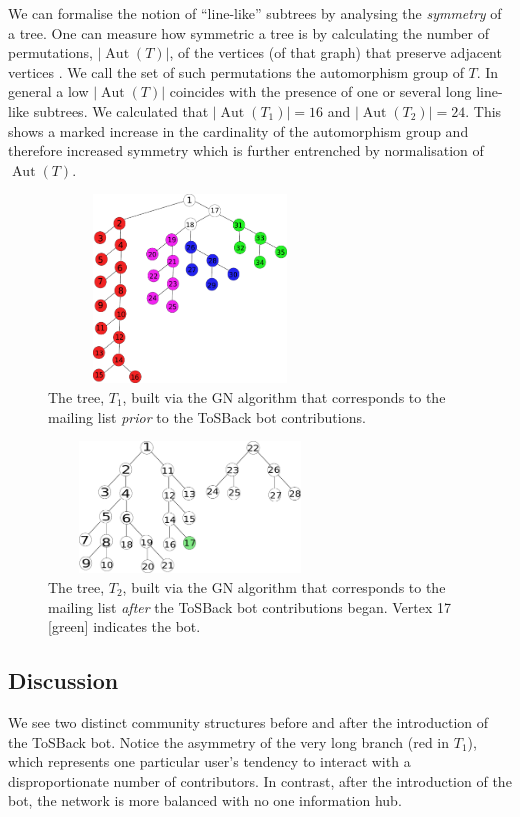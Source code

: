 \documentclass{sig-alternate}
\DeclareMathOperator{\Aut}{Aut}
\begin{document}
We can formalise the notion of “line-like” subtrees by analysing the \emph{symmetry} of  
a tree.  One can measure how symmetric
a tree is by calculating the number of permutations, $\lvert \Aut(T) \rvert$, of the
vertices (of that graph) that preserve adjacent vertices \cite{bela:mgt}. We
call the set of such permutations the automorphism group of $T$. In general a low $\lvert \Aut(T) \rvert$ coincides with the presence of one or several long line-like subtrees.  We calculated that $\lvert \Aut(T_1)\rvert = 16$ and $\vert \Aut(T_2)\rvert = 24$.  This shows a marked
increase in the cardinality of the automorphism group and
therefore increased symmetry which is further entrenched by normalisation of $\Aut(T)$.
\begin{figure}[H]
\includegraphics[width=7.5cm, height  = 5cm]{t15.pdf}\caption{ The tree, $T_1$, built via the GN algorithm that corresponds to the mailing list \emph{prior} to the ToSBack bot contributions.}\label{fig:t1}
\end{figure}
\begin{figure}[H]
\includegraphics[width=7.5cm, height=3.5cm]{t26.pdf}\caption[width=7]{ The tree, $T_2$, built via the GN algorithm that corresponds to the mailing list \emph{after} the ToSBack bot contributions began.  Vertex 17 [green] indicates the bot. }\label{fig:t2}
\end{figure}

\subsection{Discussion}
We see two distinct community structures before and after the introduction of the ToSBack bot. Notice the asymmetry of the very long branch (red in $T_1$), which represents one particular user's tendency to interact with a disproportionate number of contributors. In contrast, after the introduction of the bot, the network is more balanced with no one information hub. %
\end{document}
